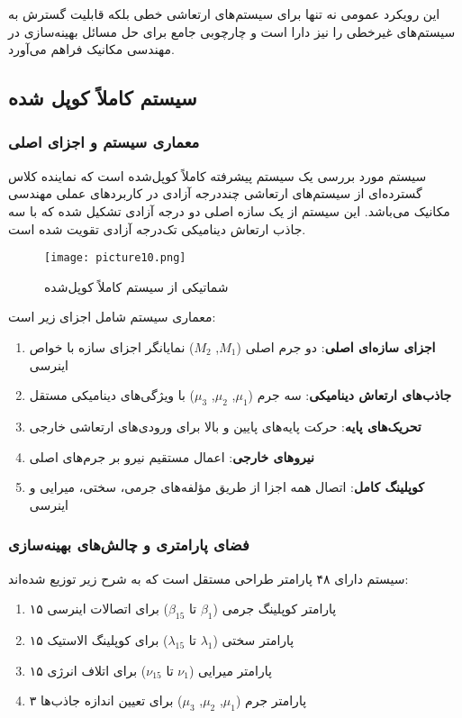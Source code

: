 این رویکرد عمومی نه تنها برای سیستم‌های ارتعاشی خطی بلکه قابلیت گسترش به سیستم‌های غیرخطی را نیز دارا است و چارچوبی جامع برای حل مسائل بهینه‌سازی در مهندسی مکانیک فراهم می‌آورد.

\subsection{سیستم کاملاً کوپل شده }

\subsubsection{معماری سیستم و اجزای اصلی}
سیستم مورد بررسی یک سیستم پیشرفته کاملاً کوپل‌شده  است که نماینده کلاس گسترده‌ای از سیستم‌های ارتعاشی چنددرجه آزادی در کاربردهای عملی مهندسی مکانیک می‌باشد. این سیستم از یک سازه اصلی دو درجه آزادی تشکیل شده که با سه جاذب ارتعاش دینامیکی تک‌درجه آزادی تقویت شده است.

\begin{figure}[H]
  \centering
  \texttt{[image: picture10.png]}
  \caption{شماتیکی از سیستم کاملاً کوپل‌شده }\label{fig:2DOF-3DOF schematic}
\end{figure}

معماری سیستم شامل اجزای زیر است:
\begin{enumerate}
    \item \textbf{اجزای سازه‌ای اصلی}: دو جرم اصلی ($M_1$, $M_2$) نمایانگر اجزای سازه با خواص اینرسی
    \item \textbf{جاذب‌های ارتعاش دینامیکی}: سه جرم  ($\mu_1$, $\mu_2$, $\mu_3$) با ویژگی‌های دینامیکی مستقل
    \item \textbf{تحریک‌های پایه}: حرکت پایه‌های پایین و بالا برای ورودی‌های ارتعاشی خارجی
    \item \textbf{نیروهای خارجی}: اعمال مستقیم نیرو بر جرم‌های اصلی
    \item \textbf{کوپلینگ کامل}: اتصال همه اجزا از طریق مؤلفه‌های جرمی، سختی، میرایی و اینرسی
\end{enumerate}

\subsubsection{فضای پارامتری و چالش‌های بهینه‌سازی}
سیستم دارای ۴۸ پارامتر طراحی مستقل است که به شرح زیر توزیع شده‌اند:
\begin{enumerate}
    \item ۱۵ پارامتر کوپلینگ جرمی ($\beta_1$ تا $\beta_{15}$) برای اتصالات اینرسی
    \item ۱۵ پارامتر سختی ($\lambda_1$ تا $\lambda_{15}$) برای کوپلینگ الاستیک
    \item ۱۵ پارامتر میرایی ($\nu_1$ تا $\nu_{15}$) برای اتلاف انرژی
    \item ۳ پارامتر جرم  ($\mu_1$, $\mu_2$, $\mu_3$) برای تعیین اندازه جاذب‌ها
\end{enumerate}

